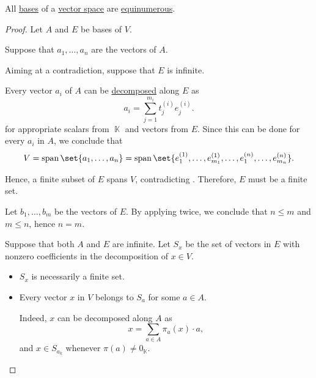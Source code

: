 \begin{proposition}\label{thm:vector_space_dimension}
  All \hyperref[def:hamel_basis]{bases} of a \hyperref[def:vector_space]{vector space} are \hyperref[def:equinumerosity]{equinumerous}.
\end{proposition}
\begin{proof}
  Let \( A \) and \( E \) be bases of \( V \).

   Suppose that \( a_1, \ldots, a_n \) are the vectors of \( A \).

   Aiming at a contradiction, suppose that \( E \) is infinite.

  Every vector \( a_i \) of \( A \) can be \hyperref[def:basis_decomposition]{decomposed} along \( E \) as
  \begin{equation*}
    a_i = \sum_{j=1}^{m_i} t^{(i)}_j e^{(i)}_j.
  \end{equation*}
  for appropriate scalars from \( \BbbK \) and vectors from \( E \). Since this can be done for every \( a_i \) in \( A \), we conclude that
  \begin{equation*}
    V = \linspan\set{ a_1, \ldots, a_n } = \linspan\set{ e^{(1)}_1, \ldots, e^{(1)}_{m_1}, \ldots, e^{(n)}_1, \ldots, e^{(n)}_{m_n} }.
  \end{equation*}

  Hence, a finite subset of \( E \) spans \( V \), contradicting . Therefore, \( E \) must be a finite set.

   Let \( b_1, \ldots, b_m \) be the vectors of \( E \). By applying  twice, we conclude that \( n \leq m \) and \( m \leq n \), hence \( n = m \).

   Suppose that both \( A \) and \( E \) are infinite. Let \( S_x \) be the set of vectors in \( E \) with nonzero coefficients in the decomposition of \( x \in V \).
  \begin{itemize}
    \item \( S_x \) is necessarily a finite set.
    \item Every vector \( x \) in \( V \) belongs to \( S_a \) for some \( a \in A \).

    Indeed, \( x \) can be decomposed along \( A \) as
    \begin{equation*}
      x = \sum_{a \in A} \pi_a(x) \cdot a,
    \end{equation*}
    and \( x \in S_{a_k} \) whenever \( \pi(a) \neq 0_\BbbK \).


\end{itemize}
\end{proof}
